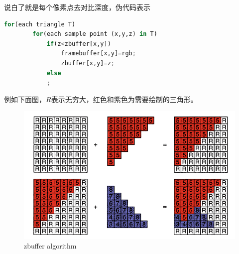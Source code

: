 说白了就是每个像素点去对比深度，伪代码表示

\begin{lstlisting}[language=python]
    for(each triangle T)
        for(each sample point (x,y,z) in T)
            if(z<zbuffer[x,y])
                framebuffer[x,y]=rgb;
                zbuffer[x,y]=z;
            else
            ;
\end{lstlisting}

例如下面图，$R$表示无穷大，红色和紫色为需要绘制的三角形。
\begin{figure}[H]
    \centering
    \includegraphics[scale=0.6]{figures/zbuffer.png}
    \caption[short]{zbuffer algorithm}
\end{figure}

